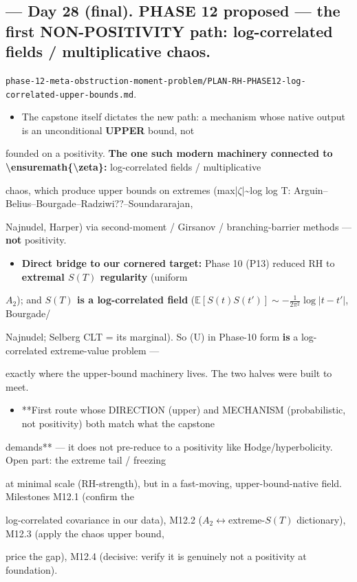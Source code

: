 \documentclass[10pt]{article}
\begin{document}
\subsection*{ --- Day 28 (final). PHASE 12 proposed --- the first NON-POSITIVITY path: log-correlated fields / multiplicative chaos.}
\texttt{phase-12-meta-obstruction-moment-problem/PLAN-RH-PHASE12-log-correlated-upper-bounds.md}.\par
\begin{itemize}
\item The capstone itself dictates the new path: a mechanism whose native output is an unconditional \textbf{UPPER} bound, not
\end{itemize}
  founded on a positivity. \textbf{The one such modern machinery connected to \textbackslash{}ensuremath\{\textbackslash{}zeta\}:} log-correlated fields / multiplicative\par
  chaos, which produce upper bounds on extremes (max|\ensuremath{\zeta}|\textasciitilde{}log log T: Arguin--Belius--Bourgade--Radziwi??--Soundararajan,\par
  Najnudel, Harper) via second-moment / Girsanov / branching-barrier methods --- \textbf{not} positivity.\par
\begin{itemize}
\item \textbf{Direct bridge to our cornered target:} Phase 10 (P13) reduced RH to \textbf{extremal $S(T)$ regularity} (uniform
\end{itemize}
  $A_2$); and \textbf{$S(T)$ is a log-correlated field} ($\mathbb E[S(t)S(t')]\sim-\frac1{2\pi^2}\log|t-t'|$, Bourgade/\par
  Najnudel; Selberg CLT = its marginal). So (U) in Phase-10 form \textbf{is} a log-correlated extreme-value problem ---\par
  exactly where the upper-bound machinery lives. The two halves were built to meet.\par
\begin{itemize}
\item **First route whose DIRECTION (upper) and MECHANISM (probabilistic, not positivity) both match what the capstone
\end{itemize}
  demands** --- it does not pre-reduce to a positivity like Hodge/hyperbolicity. Open part: the extreme tail / freezing\par
  at minimal scale (RH-strength), but in a fast-moving, upper-bound-native field. Milestones M12.1 (confirm the\par
  log-correlated covariance in our data), M12.2 ($A_2$\ensuremath{\leftrightarrow}extreme-$S(T)$ dictionary), M12.3 (apply the chaos upper bound,\par
  price the gap), M12.4 (decisive: verify it is genuinely not a positivity at foundation).\par
\end{document}
